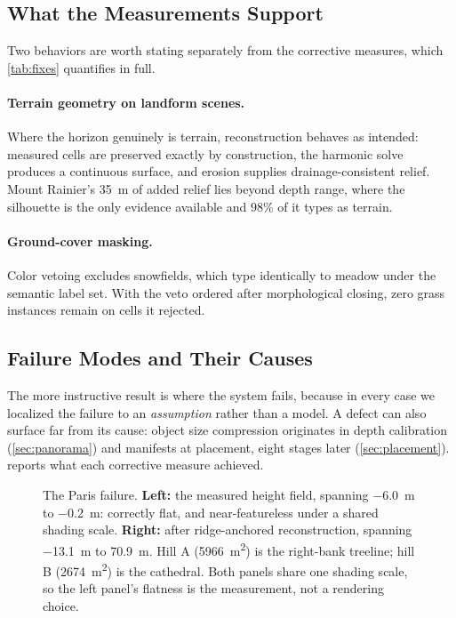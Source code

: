 \subsection{What the Measurements Support}

Two behaviors are worth stating separately from the corrective measures, which
\cref{tab:fixes} quantifies in full.

\paragraph{Terrain geometry on landform scenes.}
Where the horizon genuinely is terrain, reconstruction behaves as intended:
measured cells are preserved exactly by construction, the harmonic solve produces a
continuous surface, and erosion supplies drainage-consistent relief. Mount
Rainier's \SI{35}{\meter} of added relief lies beyond depth range, where the
silhouette is the only evidence available and $98\%$ of it types as terrain.

\paragraph{Ground-cover masking.}
Color vetoing excludes snowfields, which type identically to meadow under the
semantic label set. With the veto ordered after morphological closing, zero grass
instances remain on cells it rejected.

\subsection{Failure Modes and Their Causes}

The more instructive result is where the system fails, because in every case we
localized the failure to an \emph{assumption} rather than a model. A defect can
also surface far from its cause: object size compression originates in depth
calibration (\cref{sec:panorama}) and manifests at placement, eight stages later
(\cref{sec:placement}).
 reports what each corrective measure achieved.

\begin{figure}[t]
  \centering
  \caption{The Paris failure. \textbf{Left:} the measured height field, spanning
  \SI{-6.0}{\meter} to \SI{-0.2}{\meter}: correctly flat, and near-featureless
  under a shared shading scale. \textbf{Right:} after ridge-anchored reconstruction,
  spanning \SI{-13.1}{\meter} to \SI{+70.9}{\meter}. Hill \textsf{A}
  (\SI{5966}{\meter\squared}) is the right-bank treeline; hill \textsf{B}
  (\SI{2674}{\meter\squared}) is the cathedral. Both panels share one shading
  scale, so the left panel's flatness is the measurement, not a rendering choice.}
  \label{fig:paris-terrain}
\end{figure}

